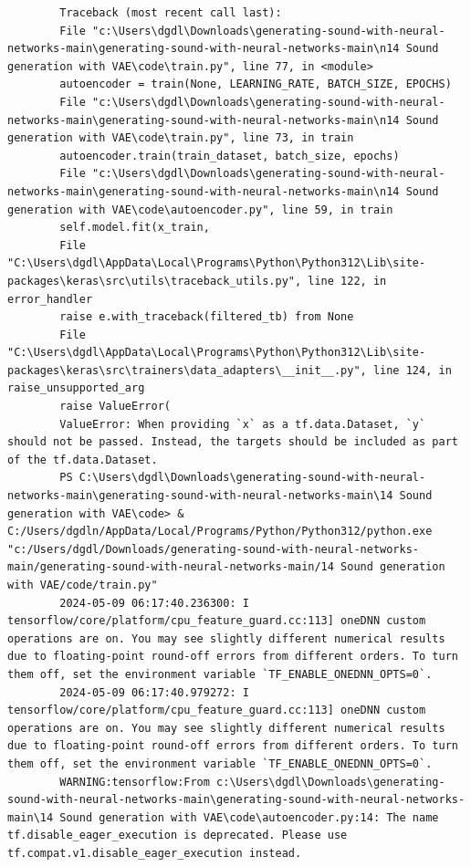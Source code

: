 \documentclass[12pt, a4paper]{article}
\begin{document}
	\vspace*{2\baselineskip}
	\begin{verbatim}
		Traceback (most recent call last):
		File "c:\Users\dgdl\Downloads\generating-sound-with-neural-networks-main\generating-sound-with-neural-networks-main\n14 Sound generation with VAE\code\train.py", line 77, in <module>
		autoencoder = train(None, LEARNING_RATE, BATCH_SIZE, EPOCHS)
		File "c:\Users\dgdl\Downloads\generating-sound-with-neural-networks-main\generating-sound-with-neural-networks-main\n14 Sound generation with VAE\code\train.py", line 73, in train
		autoencoder.train(train_dataset, batch_size, epochs)
		File "c:\Users\dgdl\Downloads\generating-sound-with-neural-networks-main\generating-sound-with-neural-networks-main\n14 Sound generation with VAE\code\autoencoder.py", line 59, in train
		self.model.fit(x_train,
		File "C:\Users\dgdl\AppData\Local\Programs\Python\Python312\Lib\site-packages\keras\src\utils\traceback_utils.py", line 122, in error_handler
		raise e.with_traceback(filtered_tb) from None
		File "C:\Users\dgdl\AppData\Local\Programs\Python\Python312\Lib\site-packages\keras\src\trainers\data_adapters\__init__.py", line 124, in raise_unsupported_arg
		raise ValueError(
		ValueError: When providing `x` as a tf.data.Dataset, `y` should not be passed. Instead, the targets should be included as part of the tf.data.Dataset.
		PS C:\Users\dgdl\Downloads\generating-sound-with-neural-networks-main\generating-sound-with-neural-networks-main\14 Sound generation with VAE\code> & C:/Users/dgdln/AppData/Local/Programs/Python/Python312/python.exe "c:/Users/dgdl/Downloads/generating-sound-with-neural-networks-main/generating-sound-with-neural-networks-main/14 Sound generation with VAE/code/train.py"
		2024-05-09 06:17:40.236300: I tensorflow/core/platform/cpu_feature_guard.cc:113] oneDNN custom operations are on. You may see slightly different numerical results due to floating-point round-off errors from different orders. To turn them off, set the environment variable `TF_ENABLE_ONEDNN_OPTS=0`.
		2024-05-09 06:17:40.979272: I tensorflow/core/platform/cpu_feature_guard.cc:113] oneDNN custom operations are on. You may see slightly different numerical results due to floating-point round-off errors from different orders. To turn them off, set the environment variable `TF_ENABLE_ONEDNN_OPTS=0`.
		WARNING:tensorflow:From c:\Users\dgdl\Downloads\generating-sound-with-neural-networks-main\generating-sound-with-neural-networks-main\14 Sound generation with VAE\code\autoencoder.py:14: The name tf.disable_eager_execution is deprecated. Please use tf.compat.v1.disable_eager_execution instead.
	\end{verbatim}
\end{document}
